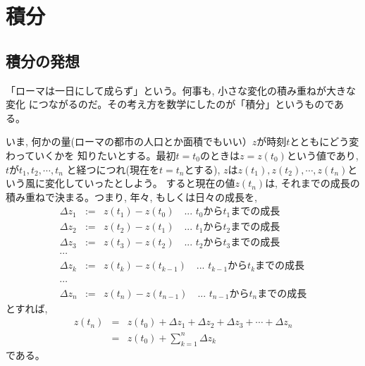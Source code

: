 \chapter{積分}


\section{積分の発想}
「ローマは一日にして成らず」という。何事も, 小さな変化の積み重ねが大きな変化
につながるのだ。その考え方を数学にしたのが「積分」というものである。

いま, 何かの量(ローマの都市の人口とか面積でもいい）$z$が時刻$t$とともにどう変わっていくかを
知りたいとする。最初$t=t_0$のときは$z=z(t_0)$という値であり, $t$が$t_1, t_2, \cdots, t_n$
と経つにつれ(現在を$t=t_n$とする), $z$は$z(t_1), z(t_2), \cdots, z(t_n)$という風に変化していったとしよう。
すると現在の値$z(t_n)$は, それまでの成長の積み重ねで決まる。つまり, 年々, もしくは日々の成長を, 
\begin{eqnarray}
\Delta z_1&:=&z(t_1)-z(t_0)\,\,\,\,\text{ ... $t_0$から$t_1$までの成長}\nonumber\\
\Delta z_2&:=&z(t_2)-z(t_1)\,\,\,\,\text{ ... $t_1$から$t_2$までの成長}\nonumber\\
\Delta z_3&:=&z(t_3)-z(t_2)\,\,\,\,\text{ ... $t_2$から$t_3$までの成長}\nonumber\\
\cdots\nonumber\\
\Delta z_k&:=&z(t_k)-z(t_{k-1})\,\,\,\,\text{ ... $t_{k-1}$から$t_k$までの成長}\nonumber\\\label{eq:deltaz0}\\
\cdots\nonumber\\
\Delta z_n&:=&z(t_n)-z(t_{n-1})\,\,\,\,\text{ ... $t_{n-1}$から$t_n$までの成長}\nonumber
\end{eqnarray}
とすれば, 
\begin{eqnarray}
z(t_n)&=&z(t_0)+\Delta z_1 + \Delta z_2 + \Delta z_3 + \cdots + \Delta z_n\nonumber\\
   &=&z(t_0)+\sum^{n}_{k=1}\Delta z_k\label{eq:sum_deltaz}
\end{eqnarray}
である。

